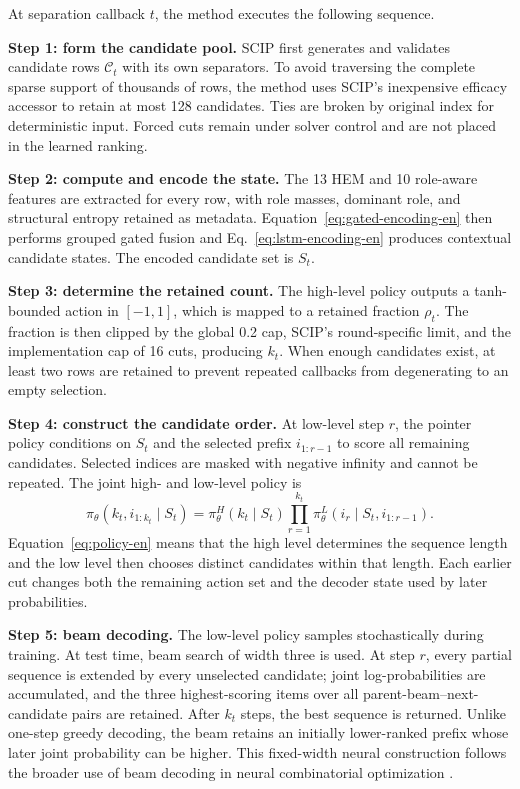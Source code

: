 \documentclass[final,5p,times,twocolumn]{elsarticle}
\begin{document}
At separation callback $t$, the method executes the following sequence.

\noindent\textbf{Step 1: form the candidate pool.} SCIP first generates and validates candidate rows $\mathcal C_t$ with its own separators. To avoid traversing the complete sparse support of thousands of rows, the method uses SCIP's inexpensive efficacy accessor to retain at most 128 candidates. Ties are broken by original index for deterministic input. Forced cuts remain under solver control and are not placed in the learned ranking.

\noindent\textbf{Step 2: compute and encode the state.} The 13 HEM and 10 role-aware features are extracted for every row, with role masses, dominant role, and structural entropy retained as metadata. Equation~\eqref{eq:gated-encoding-en} then performs grouped gated fusion and Eq.~\eqref{eq:lstm-encoding-en} produces contextual candidate states. The encoded candidate set is $S_t$.

\noindent\textbf{Step 3: determine the retained count.} The high-level policy outputs a tanh-bounded action in $[-1,1]$, which is mapped to a retained fraction $\rho_t$. The fraction is then clipped by the global 0.2 cap, SCIP's round-specific limit, and the implementation cap of 16 cuts, producing $k_t$. When enough candidates exist, at least two rows are retained to prevent repeated callbacks from degenerating to an empty selection.

\noindent\textbf{Step 4: construct the candidate order.} At low-level step $r$, the pointer policy conditions on $S_t$ and the selected prefix $i_{1:r-1}$ to score all remaining candidates. Selected indices are masked with negative infinity and cannot be repeated. The joint high- and low-level policy is
\begin{equation}
\pi_\theta(k_t,i_{1:k_t}\mid S_t)=\pi_\theta^H(k_t\mid S_t)
\prod_{r=1}^{k_t}\pi_\theta^L(i_r\mid S_t,i_{1:r-1}).
\label{eq:policy-en}
\end{equation}
Equation~\eqref{eq:policy-en} means that the high level determines the sequence length and the low level then chooses distinct candidates within that length. Each earlier cut changes both the remaining action set and the decoder state used by later probabilities.

\noindent\textbf{Step 5: beam decoding.} The low-level policy samples stochastically during training. At test time, beam search of width three is used. At step $r$, every partial sequence is extended by every unselected candidate; joint log-probabilities are accumulated, and the three highest-scoring items over all parent-beam--next-candidate pairs are retained. After $k_t$ steps, the best sequence is returned. Unlike one-step greedy decoding, the beam retains an initially lower-ranked prefix whose later joint probability can be higher. This fixed-width neural construction follows the broader use of beam decoding in neural combinatorial optimization \citep{choo2022beam}.
\end{document}
